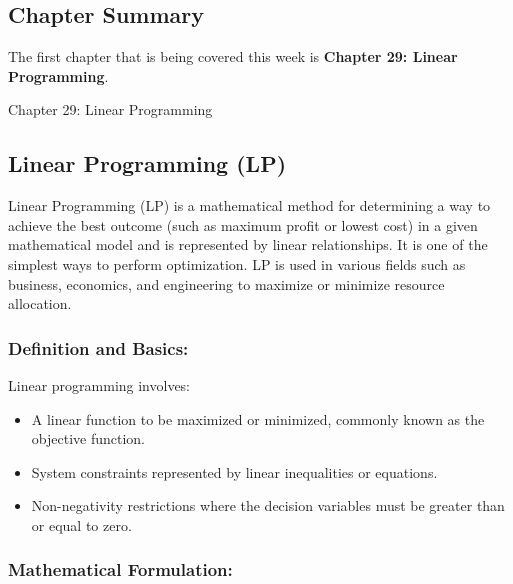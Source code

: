 \newpage

\subsection{Chapter Summary}

The first chapter that is being covered this week is \textbf{Chapter 29: Linear Programming}.

\begin{notes}{Chapter 29: Linear Programming}
    \subsection*{Linear Programming (LP)}

    Linear Programming (LP) is a mathematical method for determining a way to achieve the best outcome (such as maximum profit or lowest cost) in a given mathematical model and is represented by 
    linear relationships. It is one of the simplest ways to perform optimization. LP is used in various fields such as business, economics, and engineering to maximize or minimize resource allocation. \vspace*{1em}
    
    \subsubsection*{Definition and Basics:}
    
    Linear programming involves:
    \begin{itemize}
        \item A linear function to be maximized or minimized, commonly known as the objective function.
        \item System constraints represented by linear inequalities or equations.
        \item Non-negativity restrictions where the decision variables must be greater than or equal to zero.
    \end{itemize}
    
    \subsubsection*{Mathematical Formulation:}
    

\end{notes}
